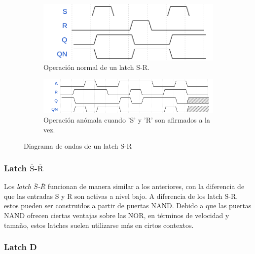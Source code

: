 \begin{figure}[h]
    \centering
  
    \begin{subfigure}[b]{0.35\textwidth}
      \includegraphics[width=\textwidth]{figs/wavedrom-latch-sr.png}
      \caption{Operación normal de un latch S-R.}
      \label{fig:wave-latch-sr1}
    \end{subfigure}
    \hfill
    \begin{subfigure}[b]{0.55\textwidth}
      \includegraphics[width=\textwidth]{figs/wavedrom-latch-sr2.png}
      \caption{Operación anómala cuando 'S' y 'R' son afirmados a la vez.}
      \label{fig:wave-latch-sr2}
    \end{subfigure}
  
    \caption{Diagrama de ondas de un latch S-R}
    \label{fig:wave-latch-sr}
\end{figure}

\subsubsection{Latch $\overline{\text{S}}$-$\overline{\text{R}}$}
Los \emph{latch $\overline{S}$-$\overline{R}$} funcionan de manera similar a los anteriores, con la diferencia de que las entradas S y R son activas a nivel bajo. A diferencia de los latch S-R, estos pueden ser construidos a partir de puertas NAND. Debido a que las puertas NAND ofrecen ciertas ventajas sobre las NOR, en términos de velocidad y tamaño, estos latches suelen utilizarse más en cirtos contextos.

\subsubsection{Latch D}


